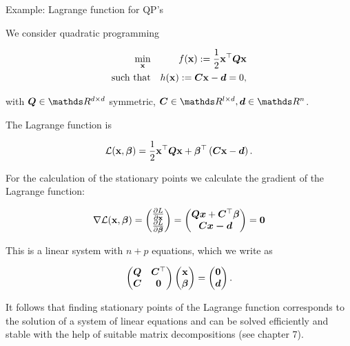 \documentclass[11pt,compress,t,notes=noshow, xcolor=table]{beamer}
\begin{document}
\begin{vbframe}{Example: Lagrange function for QP's}


We consider quadratic programming

\begin{eqnarray*}
\min_{\mathbf{x}} && f(\mathbf{x}) := \frac{1}{2} \mathbf{x}^\top \bm{Q} \mathbf{x} \\
\text{such that} && h(\mathbf{x}) := \bm{C} \mathbf{x} - \bm{d} = 0,
\end{eqnarray*}

with $\bm{Q} \in \R^{d\times d}$ symmetric, $\bm{C} \in \R^{l \times d}, \bm{d} \in \R^n$.

\lz

The Lagrange function is

$$
\mathcal{L}(\mathbf{x}, \bm{\beta}) = \frac{1}{2} \mathbf{x}^\top \bm{Q} \mathbf{x} + \bm{\beta}^\top \left(\bm{C} \mathbf{x} - \bm{d}\right).
$$

\framebreak

For the calculation of the stationary points we calculate the gradient of the Lagrange function:

$$
\nabla \mathcal{L}(\mathbf{x}, \bm{\beta}) = \begin{pmatrix} \frac{\partial{L}}{\partial{\mathbf{x}}}  \\ \frac{\partial{L}}{\partial{\bm{\beta}}} \end{pmatrix} = \begin{pmatrix} \bm{Qx} + \bm{C}^\top\bm{\beta} \\ \bm{Cx - \bm{d}} \end{pmatrix} = \bm{0}
$$

This is a linear system with $n + p$ equations, which we write as

$$
\begin{pmatrix} \bm{Q} & \bm{C}^\top \\ \bm{C} & \bm{0} \end{pmatrix} \begin{pmatrix} \mathbf{x} \\ \bm{\beta} \end{pmatrix} = \begin{pmatrix} \bm{0} \\ \bm{d}  \end{pmatrix}.
$$

It follows that finding stationary points of the Lagrange function corresponds to the solution of a system of linear equations and can be solved efficiently and stable with the help of suitable matrix decompositions (see chapter 7).
\end{vbframe}
\end{document}
